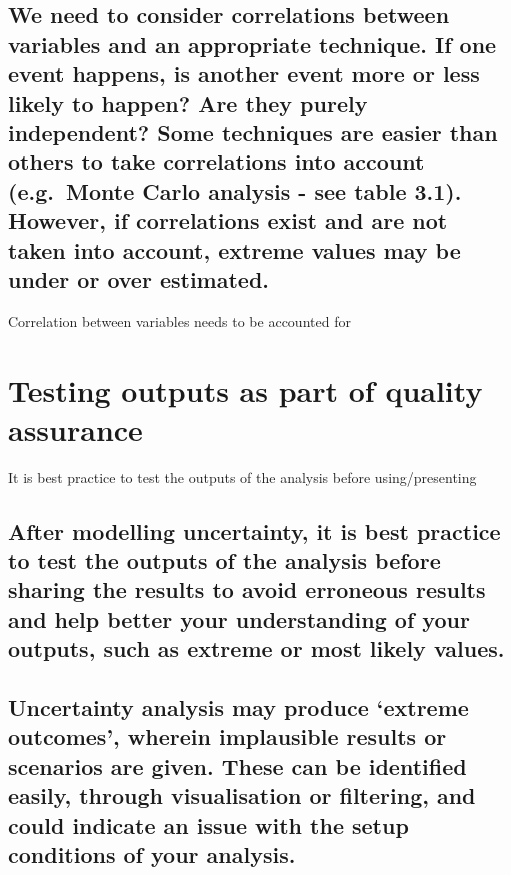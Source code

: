 \documentclass[]{book}
\begin{document}
\subsection{We need to consider correlations between variables and an
appropriate technique. If one event happens, is another event more or
less likely to happen? Are they purely independent? Some techniques are
easier than others to take correlations into account (e.g.~Monte Carlo
analysis - see table 3.1). However, if correlations exist and are not
taken into account, extreme values may be under or over
estimated.}\label{we-need-to-consider-correlations-between-variables-and-an-appropriate-technique.-if-one-event-happens-is-another-event-more-or-less-likely-to-happen-are-they-purely-independent-some-techniques-are-easier-than-others-to-take-correlations-into-account-e.g.monte-carlo-analysis---see-table-3.1.-however-if-correlations-exist-and-are-not-taken-into-account-extreme-values-may-be-under-or-over-estimated.}

 Correlation between variables needs to be accounted for

\section{Testing outputs as part of quality
assurance}\label{testing-outputs-as-part-of-quality-assurance}

 It is best practice to test the outputs of the analysis before
using/presenting

\subsection{After modelling uncertainty, it is best practice to test the
outputs of the analysis before sharing the results to avoid erroneous
results and help better your understanding of your outputs, such as
extreme or most likely
values.}\label{after-modelling-uncertainty-it-is-best-practice-to-test-the-outputs-of-the-analysis-before-sharing-the-results-to-avoid-erroneous-results-and-help-better-your-understanding-of-your-outputs-such-as-extreme-or-most-likely-values.}

\subsection{\texorpdfstring{Uncertainty analysis may produce `extreme
outcomes', wherein implausible results or scenarios are given. These can
be identified easily, through visualisation or filtering, and could
indicate an issue with the setup conditions of your
analysis.}{Uncertainty analysis may produce extreme outcomes, wherein implausible results or scenarios are given. These can be identified easily, through visualisation or filtering, and could indicate an issue with the setup conditions of your analysis.}}\label{uncertainty-analysis-may-produce-extreme-outcomes-wherein-implausible-results-or-scenarios-are-given.-these-can-be-identified-easily-through-visualisation-or-filtering-and-could-indicate-an-issue-with-the-setup-conditions-of-your-analysis.}
\end{document}
